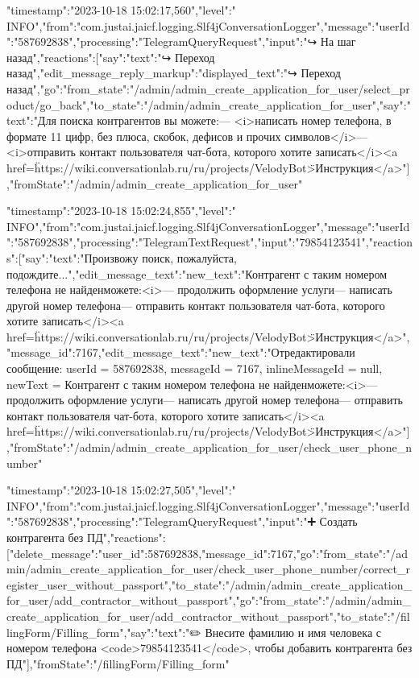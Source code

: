 \documentclass{article}
\begin{document}
\item{
{"timestamp":"2023-10-18 15:02:17,560","level":" INFO","from":"com.justai.jaicf.logging.Slf4jConversationLogger","message":{"userId":"587692838","processing":"TelegramQueryRequest","input":"↪️ На шаг назад","reactions":[{"say":{"text":"↪️ Переход назад"}},{"edit_message_reply_markup":{"displayed_text":"↪️ Переход назад"}},{"go":{"from_state":"/admin/admin_create_application_for_user/select_product/go_back","to_state":"/admin/admin_create_application_for_user"}},{"say":{"text":"Для поиска контрагентов вы можете:\n\n— <i>написать номер телефона, в формате 11 цифр, без плюса, скобок, дефисов и прочих символов</i>\n— <i>отправить контакт пользователя чат-бота, которого хотите записать</i>\n\n<a href=\"https://wiki.conversationlab.ru/ru/projects/VelodyBot\">Инструкция</a>"}}],"fromState":"/admin/admin_create_application_for_user"}}
}
\item{
{"timestamp":"2023-10-18 15:02:24,855","level":" INFO","from":"com.justai.jaicf.logging.Slf4jConversationLogger","message":{"userId":"587692838","processing":"TelegramTextRequest","input":"79854123541","reactions":[{"say":{"text":"Произвожу поиск, пожалуйста, подождите..."}},{"edit_message_text":{"new_text":"Контрагент с таким номером телефона не найден\n{} можете:\n<i>— продолжить оформление услуги\n— написать другой номер телефона\n— отправить контакт пользователя чат-бота, которого хотите записать</i>\n\n <a href=\"https://wiki.conversationlab.ru/ru/projects/VelodyBot\">Инструкция</a>","message_id":7167}},{"edit_message_text":{"new_text":"Отредактировали сообщение: userId = 587692838, messageId = 7167, inlineMessageId = null, newText =  Контрагент с таким номером телефона не найден\n{} можете:\n<i>— продолжить оформление услуги\n— написать другой номер телефона\n— отправить контакт пользователя чат-бота, которого хотите записать</i>\n\n <a href=\"https://wiki.conversationlab.ru/ru/projects/VelodyBot\">Инструкция</a>"}}],"fromState":"/admin/admin_create_application_for_user/check_user_phone_number"}}
}

\item{
{"timestamp":"2023-10-18 15:02:27,505","level":" INFO","from":"com.justai.jaicf.logging.Slf4jConversationLogger","message":{"userId":"587692838","processing":"TelegramQueryRequest","input":"➕ Создать контрагента без ПД","reactions":[{"delete_message":{"user_id":587692838,"message_id":7167}},{"go":{"from_state":"/admin/admin_create_application_for_user/check_user_phone_number/correct_register_user_without_passport","to_state":"/admin/admin_create_application_for_user/add_contractor_without_passport"}},{"go":{"from_state":"/admin/admin_create_application_for_user/add_contractor_without_passport","to_state":"/fillingForm/Filling_form"}},{"say":{"text":"✏️ Внесите фамилию и имя человека с номером телефона <code>79854123541</code>, чтобы добавить контрагента без ПД"}}],"fromState":"/fillingForm/Filling_form"}}
}
\end{document}
